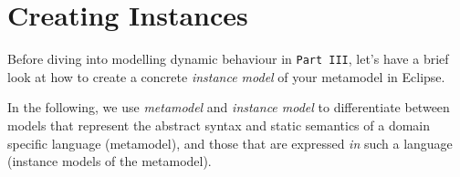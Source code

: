 \newpage
\genHeader

\section{Creating Instances}

\hypertarget{creatingInstance common}{}Before diving into modelling dynamic behaviour in \texttt{Part III}, let's have a brief look at how to create a concrete \emph{instance model} of your metamodel in Eclipse.

In the following, we use \emph{metamodel} and \emph{instance model} to differentiate between models that represent the abstract syntax and static semantics of a domain specific language (metamodel), and those that are expressed \emph{in} such a language (instance models of the metamodel).

